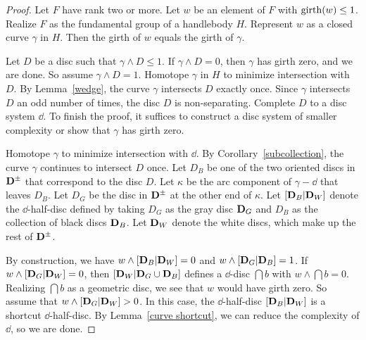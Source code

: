 \begin{proof}
Let $F$ have rank two or more.  Let $w$ be an element of $F$ with $\operatorname{girth}(w)\leq 1$.  Realize $F$ as the fundamental group of a handlebody $H$.  Represent $w$ as a closed curve $\gamma$ in $H$.  Then the girth of $w$ equals the girth of $\gamma$.

Let $D$ be a disc such that $\gamma\wedge D\leq 1$.  If $\gamma\wedge D=0$, then $\gamma$ has girth zero, and we are done.  So assume $\gamma\wedge D=1$.  Homotope $\gamma$ in $H$ to minimize intersection with $D$.  By Lemma~\ref{wedge}, the curve $\gamma$ intersects $D$ exactly once.  Since $\gamma$ intersects $D$ an odd number of times, the disc $D$ is non-separating.  Complete $D$ to a disc system $\dd$.  To finish the proof, it suffices to construct a disc system of smaller complexity or show that $\gamma$ has girth zero.

Homotope $\gamma$ to minimize intersection with $\dd$.  By Corollary~\ref{subcollection}, the curve $\gamma$ continues to intersect $D$ once.  Let $D_{B}$ be one of the two oriented discs in $\mathbf{D}^\pm$ that correspond to the disc $D$.  Let $\kappa$ be the arc component of $\gamma-\dd$ that leaves $D_{B}$.  Let $D_{G}$ be the disc in $\mathbf{D}^\pm$ at the other end of $\kappa$.  Let $[\mathbf{D}_B | \mathbf{D}_W]$ denote the $\dd$-half-disc defined by taking $D_{G}$ as the gray disc $\mathbf{D}_G$ and $D_{B}$ as the collection of black discs $\mathbf{D}_B$.  Let $\mathbf{D}_W$ denote the white discs, which make up the rest of $\mathbf{D}^\pm$.

By construction, we have $w\wedge[\mathbf{D}_B | \mathbf{D}_W]=0$ and $w\wedge[\mathbf{D}_G | \mathbf{D}_B]=1$.  If $w\wedge[\mathbf{D}_G | \mathbf{D}_W]=0$, then $[\mathbf{D}_W | \mathbf{D}_G\cup\mathbf{D}_B]$ defines a $\dd$-disc $\dint{b}$ with $w\wedge\dint{b}=0$.  Realizing $\dint{b}$ as a geometric disc, we see that $w$ would have girth zero.  So assume that $w\wedge[\mathbf{D}_G | \mathbf{D}_W]>0$.  In this case, the $\dd$-half-disc $[\mathbf{D}_B | \mathbf{D}_W]$ is a shortcut $\dd$-half-disc.  By Lemma~\ref{curve shortcut}, we can reduce the complexity of $\dd$, so we are done.
\end{proof}
